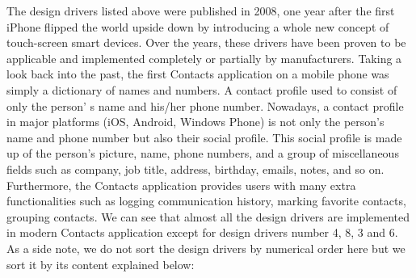 The design drivers listed above were published in 2008, one year after the first iPhone flipped the world upside down by introducing a whole new concept of touch-screen smart devices. Over the years, these drivers have been proven to be applicable and implemented completely or partially by manufacturers. Taking a look back into the past, the first Contacts application on a mobile phone was simply a dictionary of names and numbers. A contact profile used to consist of only the person' s name and his/her phone number. Nowadays, a contact profile in major platforms (iOS, Android, Windows Phone) is not only the person's name and phone number but also their social profile. This social profile is made up of the person's picture, name, phone numbers, and a group of miscellaneous fields such as company, job title, address, birthday, emails, notes, and so on. Furthermore, the Contacts application provides users with many extra functionalities such as logging communication history, marking favorite contacts, grouping contacts. We can see that almost all the design drivers are implemented in modern Contacts application except for design drivers number 4, 8, 3 and 6. As a side note, we do not sort the design drivers by numerical order here but we sort it by its content explained below:

